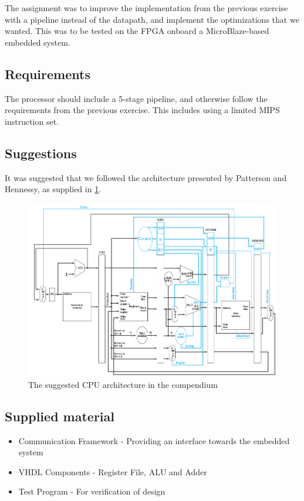 The assignment was to improve the implementation from the previous exercise with
a pipeline instead of the datapath, and implement the optimizations that we
wanted. This was to be tested on the FPGA onboard a MicroBlaze-based embedded
system.

\subsection{Requirements}
The processor should include a 5-stage pipeline, and otherwise follow the
requirements from the previous exercise. This includes using a limited MIPS
instruction set.

\subsection{Suggestions}
It was suggested that we followed the architecture presented by Patterson and
Hennessy, as supplied in \ref{fig:suggestedArchitecture}.

\begin{figure}[ht]
    \centering
    \includegraphics[width=\textwidth]{figures/SuggestedArchitecture.png}
    \caption{The suggested CPU architecture in the compendium \cite[p.118]{lab-compendium}} 
    \label{fig:suggestedArchitecture}
\end{figure}


\subsection{Supplied material}
\begin{itemize}
\item Communication Framework -  Providing an interface towards the embedded system
\item VHDL Components - Register File, ALU and Adder
\item Test Program - For verification of design
\end{itemize}
